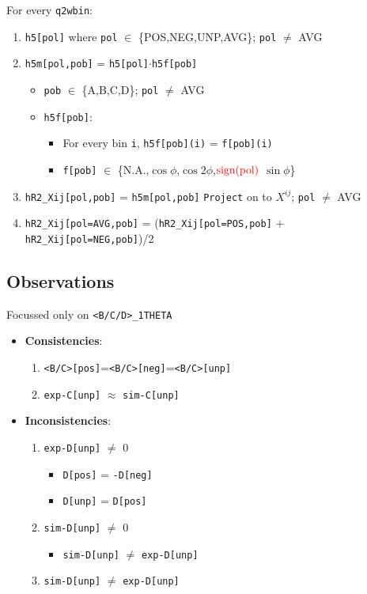 \documentclass{article}
\newcommand{\code}[1]{\texttt{#1}}
\numberwithin{equation}{subsection}
\begin{document}
For every \code{q2wbin}:
\begin{enumerate}
	\item \code{h5[pol]} where \code{pol} $\in$ \{POS,NEG,UNP,AVG\}; \code{pol} $\neq$ AVG
	\item \code{h5m[pol,pob]} = \code{h5[pol]}$\cdot$\code{h5f[pob]} 
		\begin{itemize}
		\item \code{pob} $\in$ \{A,B,C,D\}; \code{pol} $\neq$ AVG
		\item \code{h5f[pob]}:
			\begin{itemize}
			\item For every bin \code{i}, \code{h5f[pob](i)} = \code{f[pob](i)}
			\item \code{f[pob]} $\in$ \{N.A.,$\cos\phi$,$\cos 2\phi$,$\color{red}{\text{sign(pol)}}$ $\sin\phi$\}
			\end{itemize}
		\end{itemize}
	\item \code{hR2\_Xij[pol,pob]} = \code{h5m[pol,pob]} \code{Project} on to $X^{ij}$; \code{pol} $\neq$ AVG
	\item \code{hR2\_Xij[pol=AVG,pob]} = (\code{hR2\_Xij[pol=POS,pob]} + \code{hR2\_Xij[pol=NEG,pob]})/2
\end{enumerate}

\subsection{Observations}
Focussed only on \code{<B/C/D>\_1THETA}

\begin{itemize}
    \item \textbf{Consistencies}:
    \begin{enumerate}
 		\item \code{<B/C>[pos]}=\code{<B/C>[neg]}=\code{<B/C>[unp]}
 		\item \code{exp-C[unp]} $\approx$ \code{sim-C[unp]}
	\end{enumerate}
    \item \textbf{Inconsistencies}:
    \begin{enumerate}
    	\item \code{exp-D[unp]} $\neq$ 0
    	\begin{itemize}
    		\item \code{D[pos]} = \code{-D[neg]}
    		\item \code{D[unp]} = \code{D[pos]}
    	\end{itemize}
    	\item \code{sim-D[unp]} $\neq$ 0
    	\begin{itemize}
    		\item \code{sim-D[unp]} $\neq$ \code{exp-D[unp]}
    	\end{itemize}
    	\item \code{sim-D[unp]} $\neq$ \code{exp-D[unp]}
    \end{enumerate}
\end{itemize}
\end{document}
